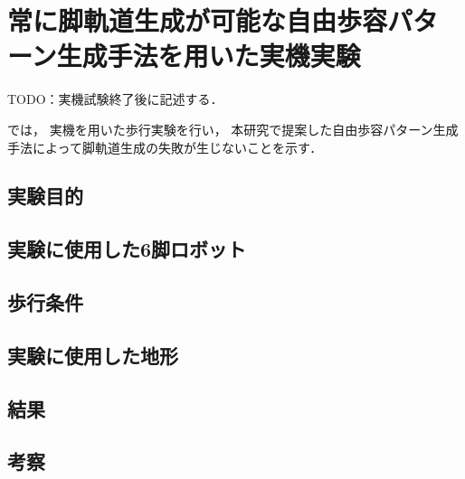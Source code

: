 ﻿
\chapter{常に脚軌道生成が可能な自由歩容パターン生成手法を用いた実機実験}\label{chapter:常に脚軌道生成が可能な自由歩容パターン生成手法を用いた実機実験}

TODO：実機試験終了後に記述する．

では，
実機を用いた歩行実験を行い，
本研究で提案した自由歩容パターン生成手法によって脚軌道生成の失敗が生じないことを示す．

\section{実験目的}


\section{実験に使用した6脚ロボット}


\section{歩行条件}

\section{実験に使用した地形}

\section{結果}

\section{考察}